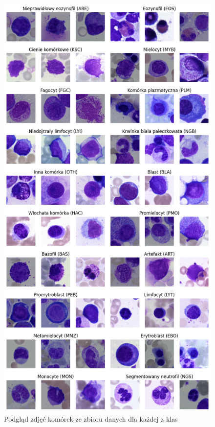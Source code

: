 \begin{figure}
    \centering
    \includegraphics[height=0.9\textheight]{images_examples}
    \caption{Podgląd zdjęć komórek ze zbioru danych dla każdej z klas}
    \label{fig:images_examples}
\end{figure}

